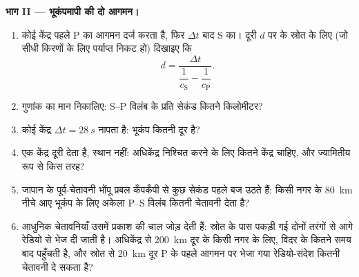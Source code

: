 \begin{problem}[{सप्ताहांत समस्या --- भूकंपों ने द्रव क्रोड कैसे
उजागर किया}]
\medskip\noindent\textbf{भाग II --- भूकंपमापी की दो आगमन।}
\begin{enumerate}[resume]
  \item कोई केंद्र पहले P का आगमन दर्ज करता है, फिर $\Delta t$ बाद
        S का। दूरी $d$ पर के स्रोत के लिए (जो सीधी किरणों के लिए
        पर्याप्त निकट हो) दिखाइए कि
        \[
        d = \frac{\Delta t}{\dfrac{1}{c_{\text{S}}} -
        \dfrac{1}{c_{\text{P}}}} .
        \]
  \item गुणांक का मान निकालिए: S--P विलंब के प्रति सेकंड कितने
        किलोमीटर?
  \item कोई केंद्र $\Delta t = \qty{28}{s}$ नापता है: भूकंप कितनी दूर
        है?
  \item एक केंद्र दूरी देता है, स्थान नहीं: अधिकेंद्र निश्चित करने के
        लिए कितने केंद्र चाहिए, और ज्यामितीय रूप से किस तरह?
  \item जापान के पूर्व-चेतावनी भोंपू प्रबल कँपकँपी से कुछ सेकंड पहले
        बज उठते हैं: किसी नगर के \qty{80}{km} नीचे आए भूकंप के लिए
        अकेला P--S विलंब कितनी चेतावनी देता है?
  \item आधुनिक चेतावनियाँ उसमें प्रकाश की चाल जोड़ देती हैं: स्रोत के
        पास पकड़ी गई  दोनों तरंगों से आगे रेडियो से भेज दी जाती
        है। अधिकेंद्र से \qty{200}{km} दूर के किसी नगर के लिए, विदर के
        कितने समय बाद  पहुँचती है, और स्रोत से \qty{20}{km} दूर
        P के पहले आगमन पर भेजा गया रेडियो-संदेश कितनी चेतावनी दे सकता
        है?
\end{enumerate}


\end{problem}

